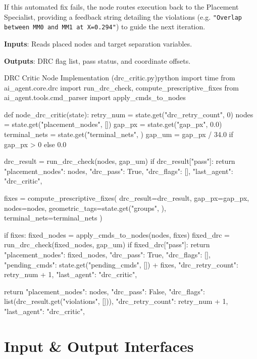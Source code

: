 If this automated fix fails, the node routes execution back to the Placement Specialist, providing a feedback string detailing the violations (e.g. \texttt{"Overlap between MM0 and MM1 at X=0.294"}) to guide the next iteration.

\textbf{Inputs}: Reads placed nodes and target separation variables.

\textbf{Outputs}: DRC flag list, pass status, and coordinate offsets.

\begin{thesiscode}{DRC Critic Node Implementation (drc\_critic.py)}{python}
import time
from ai_agent.core.drc import run_drc_check, compute_prescriptive_fixes
from ai_agent.tools.cmd_parser import apply_cmds_to_nodes

def node_drc_critic(state):
    retry_num = state.get("drc_retry_count", 0)
    nodes = state.get("placement_nodes", [])
    gap_px = state.get("gap_px", 0.0)
    terminal_nets = state.get("terminal_nets", {})
    gap_um = gap_px / 34.0 if gap_px > 0 else 0.0
    
    drc_result = run_drc_check(nodes, gap_um)
    if drc_result["pass"]:
        return {
            "placement_nodes": nodes,
            "drc_pass": True,
            "drc_flags": [],
            "last_agent": "drc_critic",
        }

    fixes = compute_prescriptive_fixes(
        drc_result=drc_result, gap_px=gap_px, nodes=nodes,
        geometric_tags=state.get("groups", {}), terminal_nets=terminal_nets
    )

    if fixes:
        fixed_nodes = apply_cmds_to_nodes(nodes, fixes)
        fixed_drc = run_drc_check(fixed_nodes, gap_um)
        if fixed_drc["pass"]:
            return {
                "placement_nodes": fixed_nodes,
                "drc_pass": True,
                "drc_flags": [],
                "pending_cmds": state.get("pending_cmds", []) + fixes,
                "drc_retry_count": retry_num + 1,
                "last_agent": "drc_critic",
            }

    return {
        "placement_nodes": nodes,
        "drc_pass": False,
        "drc_flags": list(drc_result.get("violations", [])),
        "drc_retry_count": retry_num + 1,
        "last_agent": "drc_critic",
    }
\end{thesiscode}

\section[Stage 2 I/O]{Input \& Output Interfaces}
\label{sec:placer_io}

